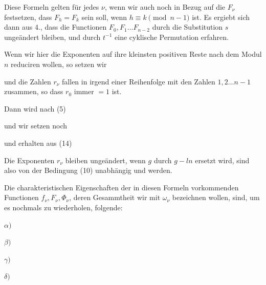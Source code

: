Diese Formeln gelten für jedes $\nu$, wenn wir auch noch in Bezug auf die
$F_\nu$ festsetzen, dass $F_h = F_k$ sein soll, wenn $h \equiv k
\pmod{n-1}$ ist. Es ergiebt sich dann aus 4., dass die Functionen $F_0,
F_1 \ldots F_{n-2}$ durch die Substitution $s$ ungeändert bleiben, und
durch $t^{-1}$ eine cyklische Permutation erfahren.

Wenn wir hier die Exponenten auf ihre kleinsten positiven Reste nach dem
Modul $n$ reduciren wollen, so setzen wir


und die Zahlen $r_\nu$ fallen in irgend einer Reihenfolge mit den Zahlen
$1, 2 \ldots n-1$ zusammen, so dass $r_0$ immer $= 1$ ist.

Dann wird nach (5)


und wir setzen noch


und erhalten aus (14)


Die Exponenten $r_\nu$ bleiben ungeändert, wenn $g$ durch $g - l n$
ersetzt wird, sind also von der Bedingung (10) unabhängig und  werden.

Die charakteristischen Eigenschaften der in diesen Formeln vorkommenden
Functionen $f_\nu, F_\nu, \Phi_\nu$, deren Gesammtheit wir mit $\omega_\nu$
bezeichnen wollen, sind, um es nochmals zu wiederholen, folgende:

$\alpha)$ 

$\beta)$ 

$\gamma)$ 

$\delta)$ 
